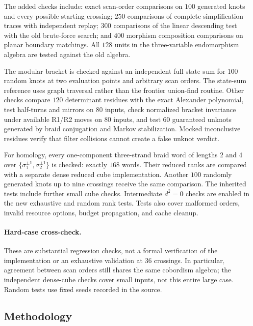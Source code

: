\documentclass[11pt]{article}
\theoremstyle{remark}\newtheorem{remark}[theorem]{Remark}
\begin{document}
The added checks include: exact scan-order comparisons on $100$ generated
knots and every possible starting crossing; $250$ comparisons of complete
simplification traces with independent replay; $300$ comparisons of the
linear descending test with the old brute-force search; and $400$ morphism
composition comparisons on planar boundary matchings. All $128$ units in
the three-variable endomorphism algebra are tested against the old algebra.

The modular bracket is checked against an independent full state sum for
$100$ random knots at two evaluation points and arbitrary scan orders.
The state-sum reference uses graph traversal rather than the frontier
union-find routine. Other checks compare $120$ determinant residues with
the exact Alexander polynomial, test half-turns and mirrors on $80$ inputs,
check normalized bracket invariance under available R1/R2 moves on $80$
inputs, and test $60$ guaranteed unknots generated by braid conjugation
and Markov stabilization. Mocked inconclusive residues verify that filter
collisions cannot create a false unknot verdict.

For homology, every one-component three-strand braid word of lengths $2$
and $4$ over $\{\sigma_1^{\pm1},\sigma_2^{\pm1}\}$ is checked: exactly
$168$ words. Their reduced ranks are compared with a separate dense reduced
cube implementation. Another $100$ randomly generated knots up to nine
crossings receive the same comparison. The inherited tests include further
small cube checks. Intermediate $d^2=0$ checks are enabled in the new
exhaustive and random rank tests. Tests also cover malformed orders,
invalid resource options, budget propagation, and cache cleanup.

\paragraph{Hard-case cross-check.}

These are substantial regression checks, not a formal verification of the
implementation or an exhaustive validation at $36$ crossings. In particular,
agreement between scan orders still shares the same cobordism algebra;
the independent dense-cube checks cover small inputs, not this entire
large case. Random tests use fixed seeds recorded in the source.

\subsection{Methodology}
\end{document}
